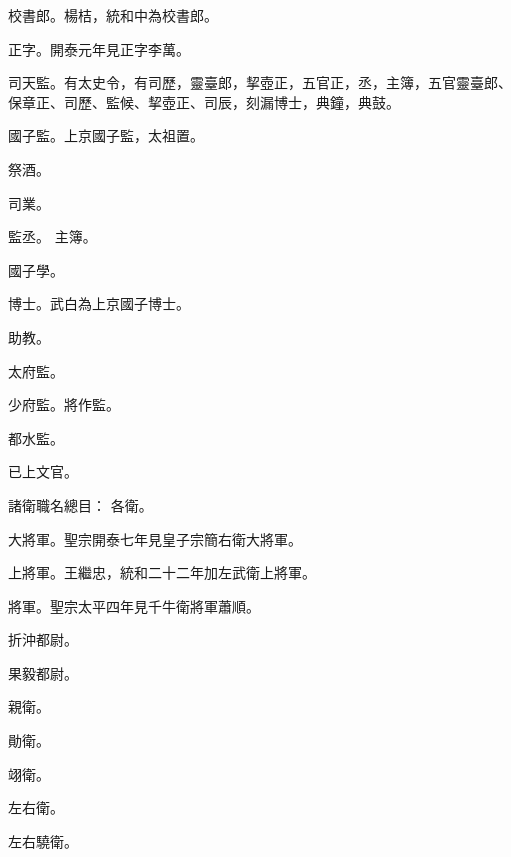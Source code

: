 \begin{pinyinscope}
 校書郎。楊桔，統和中為校書郎。



 正字。開泰元年見正字李萬。



 司天監。有太史令，有司歷，靈臺郎，挈壺正，五官正，丞，主簿，五官靈臺郎、保章正、司歷、監候、挈壺正、司辰，刻漏博士，典鐘，典鼓。



 國子監。上京國子監，太祖置。



 祭酒。



 司業。



 監丞。
 主簿。



 國子學。



 博士。武白為上京國子博士。



 助教。



 太府監。



 少府監。將作監。



 都水監。



 已上文官。



 諸衛職名總目：
 各衛。



 大將軍。聖宗開泰七年見皇子宗簡右衛大將軍。



 上將軍。王繼忠，統和二十二年加左武衛上將軍。



 將軍。聖宗太平四年見千牛衛將軍蕭順。



 折沖都尉。



 果毅都尉。



 親衛。



 勛衛。



 翊衛。



 左右衛。



 左右驍衛。




\end{pinyinscope}
